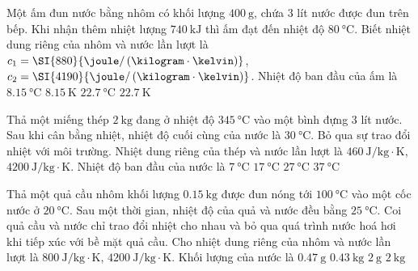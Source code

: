 \begin{ex}
	Một ấm đun nước bằng nhôm có khối lượng $\SI{400}{\gram}$, chứa 3 lít nước được đun trên bếp. Khi nhận thêm nhiệt lượng $\SI{740}{\kilo\joule}$ thì ấm đạt đến nhiệt độ $\SI{80}{\celsius}$. Biết nhiệt dung riêng của nhôm và nước lần lượt là $c_1=\SI{880}{\joule/\left(\kilogram\cdot\kelvin\right)}$, $c_2=\SI{4190}{\joule/\left(\kilogram\cdot\kelvin\right)}$. Nhiệt độ ban đầu của ấm là
	\choice
	{$\SI{8.15}{\celsius}$}
	{$\SI{8.15}{\kelvin}$}
	{\True $\SI{22.7}{\celsius}$}
	{$\SI{22.7}{\kelvin}$}
\end{ex}
\begin{ex}
Thả một miếng thép $\SI{2}{\kilogram}$ đang ở nhiệt độ $\SI{345}{\celsius}$ vào một bình đựng 3 lít nước. Sau khi cân bằng nhiệt, nhiệt độ cuối cùng của nước là $\SI{30}{\celsius}$. Bỏ qua sự trao đổi nhiệt với môi trường. Nhiệt dung riêng của thép và nước lần lượt là $\SI{460}{\joule/\kilogram\cdot\kelvin}$, $\SI{4200}{\joule/\kilogram\cdot\kelvin}$. Nhiệt độ ban đầu của nước là
	\choice
	{\True $\SI{7}{\celsius}$}
	{$\SI{17}{\celsius}$}
	{$\SI{27}{\celsius}$}
	{$\SI{37}{\celsius}$}
\end{ex}
\begin{ex}
Thả một quả cầu nhôm khối lượng $\SI{0.15}{\kilogram}$ được đun nóng tới $\SI{100}{\celsius}$ vào một cốc nước ở $\SI{20}{\celsius}$. Sau một thời gian, nhiệt độ của quả và nước đều bằng $\SI{25}{\celsius}$. Coi quả cầu và nước chỉ trao đổi nhiệt cho nhau và bỏ qua quá trình nước hoá hơi khi tiếp xúc với bề mặt quả cầu. Cho nhiệt dung riêng của nhôm và nước lần lượt là $\SI{800}{\joule/\kilogram\cdot\kelvin}$, $\SI{4200}{\joule/\kilogram\cdot\kelvin}$. Khối lượng của nước là 
	\choice
	{$\SI{0.47}{\gram}$}
	{\True $\SI{0.43}{\kilo\gram}$}
	{$\SI{2}{\gram}$}
	{$\SI{2}{\kilo\gram}$}
\end{ex}

